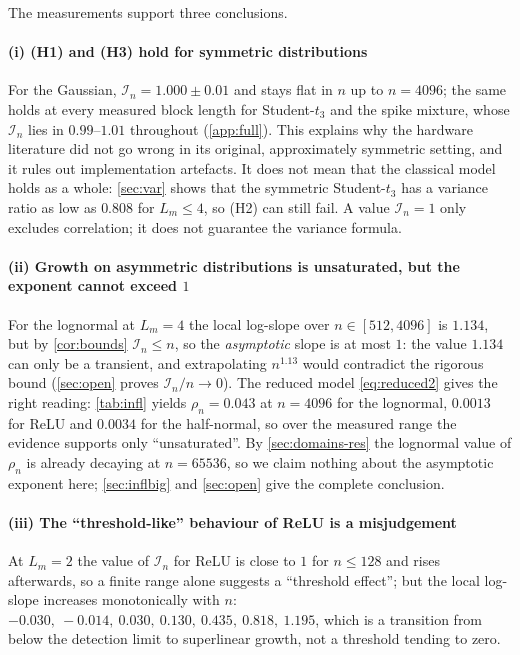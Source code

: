\documentclass[review,hidelinks,oneeqnum,onetabnum,onefignum,onethmnum]{siamart251216}
\begin{document}
The measurements support three conclusions.

\paragraph{(i) (H1) and (H3) hold for symmetric distributions} For the Gaussian,
$\mathcal I_n=1.000\pm0.01$ and stays flat in $n$ up to $n=4096$; the same holds at
every measured block length for Student-$t_3$ and the spike mixture, whose
$\mathcal I_n$ lies in $0.99$--$1.01$ throughout (\cref{app:full}).
This explains why the hardware literature did not go wrong in its original,
approximately symmetric setting, and it rules out implementation artefacts. It
does not mean that the classical model holds as a whole: \cref{sec:var} shows that
the symmetric Student-$t_3$ has a variance ratio as low as $0.808$ for
$L_m\le4$, so (H2) can still fail. A value $\mathcal I_n=1$ only excludes
correlation; it does not guarantee the variance formula.

\paragraph{(ii) Growth on asymmetric distributions is unsaturated, but the
exponent cannot exceed $1$} For the lognormal at $L_m=4$ the local log-slope over
$n\in[512,4096]$ is $1.134$, but by \cref{cor:bounds} $\mathcal I_n\le n$, so the
\emph{asymptotic} slope is at most $1$: the value $1.134$ can only be a transient,
and extrapolating $n^{1.13}$ would contradict the rigorous bound
(\cref{sec:open} proves $\mathcal I_n/n\to0$). The reduced model \cref{eq:reduced2}
gives the right reading: \cref{tab:infl} yields $\rho_n=0.043$ at $n=4096$ for the
lognormal, $0.0013$ for ReLU and $0.0034$ for the half-normal, so over the measured
range the evidence supports only ``unsaturated''. By \cref{sec:domains-res} the
lognormal value of $\rho_n$ is already decaying at $n=65536$, so we claim nothing
about the asymptotic exponent here; \cref{sec:inflbig} and \cref{sec:open} give the
complete conclusion.

\paragraph{(iii) The ``threshold-like'' behaviour of ReLU is a misjudgement} At
$L_m=2$ the value of $\mathcal I_n$ for ReLU is close to $1$ for $n\le128$ and
rises afterwards, so a finite range alone suggests a ``threshold effect''; but the
local log-slope increases monotonically with $n$:
$-0.030,\ -0.014,\ 0.030,\ 0.130,\ 0.435,\ 0.818,\ \mathbf{1.195}$, which is a
transition from below the detection limit to superlinear growth, not a threshold
tending to zero.
\end{document}
